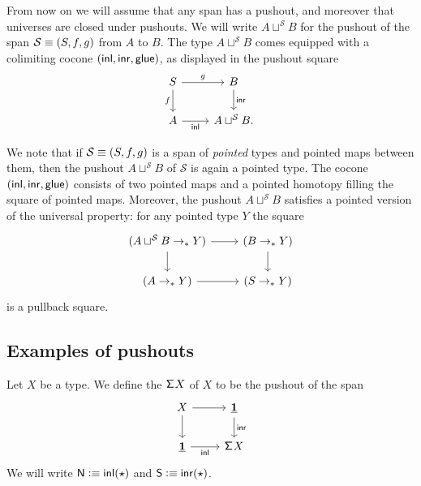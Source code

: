 \begin{defn}
From now on we will assume that any span has a pushout, and moreover that universes are closed under pushouts. We will write $A\sqcup^{\mathcal{S}} B$ for the pushout of the span $\mathcal{S}\equiv(S,f,g)$ from $A$ to $B$. The type $A\sqcup^{\mathcal{S}} B$ comes equipped with a colimiting cocone $({\mathsf{inl}},{\mathsf{inr}},\mathsf{glue})$, as displayed in the pushout square
\begin{equation*}
\begin{tikzcd}
S \arrow[d,swap,"f"] \arrow[r,"g"] & B \arrow[d,"\inr"] \\
A \arrow[r,swap,"\inl"] & A \sqcup^{\mathcal{S}} B.
\end{tikzcd}
\end{equation*}
\end{defn}

\begin{rmk}
We note that if $\mathcal{S}\equiv (S,f,g)$ is a span of \emph{pointed} types and pointed maps between them, then the pushout $A\sqcup^{\mathcal{S}} B$ of $\mathcal{S}$ is again a pointed type. The cocone $({\mathsf{inl}},{\mathsf{inr}},\mathsf{glue})$ consists of two pointed maps and a pointed homotopy filling the square of pointed maps. Moreover, the pushout $A\sqcup^{\mathcal{S}} B$ satisfies a pointed version of the universal property: for any pointed type $Y$ the square
\begin{equation*}
\begin{tikzcd}
(A\sqcup^{\mathcal{S}} B \to_\ast Y) \arrow[r] \arrow[d] & (B\to_\ast Y) \arrow[d] \\
(A\to_\ast Y) \arrow[r] & (S\to_\ast Y)
\end{tikzcd}
\end{equation*}
is a pullback square. 
\end{rmk}

\subsection{Examples of pushouts}

\begin{defn}
Let $X$ be a type. We define the  $\mathsf{\Sigma}^{} X$ of $X$ to be the pushout of the span
\begin{equation*}
\begin{tikzcd}
X \arrow[r] \arrow[d] & \unit \arrow[d,"\inr"] \\
\unit \arrow[r,swap,"\inl"] & \susp X 
\end{tikzcd}
\end{equation*}
We will write $\mathsf{N}\vcentcolon\equiv{\mathsf{inl}}(\star)$ and $\mathsf{S}\vcentcolon\equiv{\mathsf{inr}}(\star)$. 
\end{defn}

